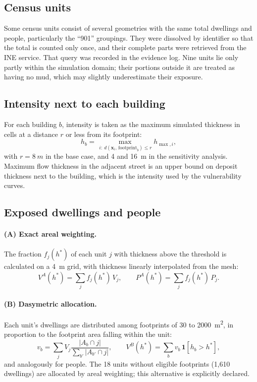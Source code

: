 \documentclass[10pt,a4paper]{article}
\begin{document}
\subsection{Census units}
Some census units consist of several geometries with the same total dwellings and people, particularly the ``901'' groupings. They were dissolved by identifier so that the total is counted only once, and their complete parts were retrieved from the INE service. That query was recorded in the evidence log. Nine units lie only partly within the simulation domain; their portions outside it are treated as having no mud, which may slightly underestimate their exposure.

\subsection{Intensity next to each building}
For each building $b$, intensity is taken as the maximum simulated thickness in cells at a distance $r$ or less from its footprint:
\begin{equation}
h_b=\max_{\,i:\ d(\mathbf x_i,\,\text{footprint}_b)\le r} h_{\max,i},
\end{equation}
with $r=\SI{8}{m}$ in the base case, and 4 and \SI{16}{m} in the sensitivity analysis. Maximum flow thickness in the adjacent street is an upper bound on deposit thickness next to the building, which is the intensity used by the vulnerability curves.

\subsection{Exposed dwellings and people}
\paragraph{(A) Exact areal weighting.} The fraction $f_j(h^*)$ of each unit $j$ with thickness above the threshold is calculated on a \SI{4}{m} grid, with thickness linearly interpolated from the mesh:
\begin{equation}
V^{A}(h^*)=\sum_j f_j(h^*)\,V_j,\qquad P^{A}(h^*)=\sum_j f_j(h^*)\,P_j .
\end{equation}
\paragraph{(B) Dasymetric allocation.} Each unit's dwellings are distributed among footprints of 30 to \SI{2000}{m^2}, in proportion to the footprint area falling within the unit:
\begin{equation}
v_b=\sum_j V_j\frac{|A_b\cap j|}{\sum_{b'}|A_{b'}\cap j|},\qquad V^{B}(h^*)=\sum_b v_b\,\mathbf 1[h_b>h^*],
\end{equation}
and analogously for people. The 18 units without eligible footprints (1,610 dwellings) are allocated by areal weighting; this alternative is explicitly declared.
\end{document}
